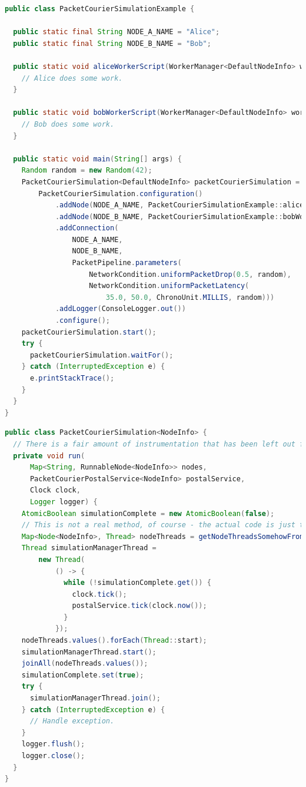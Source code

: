 \begin{lstlisting}[language=Java,caption={An example of how a \texttt{PacketCourierSimulation<NodeInfo>} might be set
up and used.},
    label={code:simulation_example},captionpos=b]
public class PacketCourierSimulationExample {

  public static final String NODE_A_NAME = "Alice";
  public static final String NODE_B_NAME = "Bob";

  public static void aliceWorkerScript(WorkerManager<DefaultNodeInfo> workerManager) {
    // Alice does some work.
  }

  public static void bobWorkerScript(WorkerManager<DefaultNodeInfo> workerManager) {
    // Bob does some work.
  }

  public static void main(String[] args) {
    Random random = new Random(42);
    PacketCourierSimulation<DefaultNodeInfo> packetCourierSimulation =
        PacketCourierSimulation.configuration()
            .addNode(NODE_A_NAME, PacketCourierSimulationExample::aliceWorkerScript)
            .addNode(NODE_B_NAME, PacketCourierSimulationExample::bobWorkerScript)
            .addConnection(
                NODE_A_NAME,
                NODE_B_NAME,
                PacketPipeline.parameters(
                    NetworkCondition.uniformPacketDrop(0.5, random),
                    NetworkCondition.uniformPacketLatency(
                        35.0, 50.0, ChronoUnit.MILLIS, random)))
            .addLogger(ConsoleLogger.out())
            .configure();
    packetCourierSimulation.start();
    try {
      packetCourierSimulation.waitFor();
    } catch (InterruptedException e) {
      e.printStackTrace();
    }
  }
}
\end{lstlisting}

\newpage

\begin{lstlisting}[language=Java,caption={A \emph{massively} cut-down version of the
\texttt{PacketCourierSimulation<NodeInfo>} class.},
    label={code:simulation_class},captionpos=b]
public class PacketCourierSimulation<NodeInfo> {
  // There is a fair amount of instrumentation that has been left out for simplicity's sake.
  private void run(
      Map<String, RunnableNode<NodeInfo>> nodes,
      PacketCourierPostalService<NodeInfo> postalService,
      Clock clock,
      Logger logger) {
    AtomicBoolean simulationComplete = new AtomicBoolean(false);
    // This is not a real method, of course - the actual code is just too long!
    Map<Node<NodeInfo>, Thread> nodeThreads = getNodeThreadsSomehowFrom(nodes);
    Thread simulationManagerThread =
        new Thread(
            () -> {
              while (!simulationComplete.get()) {
                clock.tick();
                postalService.tick(clock.now());
              }
            });
    nodeThreads.values().forEach(Thread::start);
    simulationManagerThread.start();
    joinAll(nodeThreads.values());
    simulationComplete.set(true);
    try {
      simulationManagerThread.join();
    } catch (InterruptedException e) {
      // Handle exception.
    }
    logger.flush();
    logger.close();
  }
}
\end{lstlisting}

